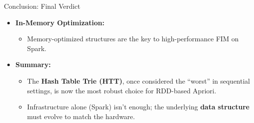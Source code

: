 \begin{frame}{Conclusion: Final Verdict}
    \begin{itemize}
        \item \textbf{In-Memory Optimization:} 
        \begin{itemize}
            \item Memory-optimized structures are the key to high-performance FIM on Spark.
        \end{itemize}
        \vfill
        \item \textbf{Summary:}
        \begin{itemize}
            \item The \textbf{Hash Table Trie (HTT)}, once considered the ``worst'' in sequential settings, is now the most robust choice for RDD-based Apriori.
            \item Infrastructure alone (Spark) isn't enough; the underlying \textbf{data structure} must evolve to match the hardware.
        \end{itemize}
    \end{itemize}

    \vfill
    \centering
\end{frame}
